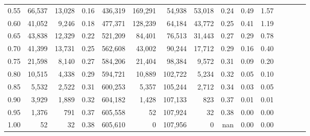 \begin{tabular}{rrrcrrrrrrrrrrr}
0.55 &  66,537 &  13,028 &                                       0.16 &  436,319 &  169,291 &   54,938 &   53,018 &  0.24 &  0.49 &                         1.57 \\
0.60 &  41,052 &   9,246 &                                       0.18 &  477,371 &  128,239 &   64,184 &   43,772 &  0.25 &  0.41 &                         1.19 \\
0.65 &  43,838 &  12,329 &                                       0.22 &  521,209 &   84,401 &   76,513 &   31,443 &  0.27 &  0.29 &                         0.78 \\
0.70 &  41,399 &  13,731 &                                       0.25 &  562,608 &   43,002 &   90,244 &   17,712 &  0.29 &  0.16 &                         0.40 \\
0.75 &  21,598 &   8,140 &                                       0.27 &  584,206 &   21,404 &   98,384 &    9,572 &  0.31 &  0.09 &                         0.20 \\
0.80 &  10,515 &   4,338 &                                       0.29 &  594,721 &   10,889 &  102,722 &    5,234 &  0.32 &  0.05 &                         0.10 \\
0.85 &   5,532 &   2,522 &                                       0.31 &  600,253 &    5,357 &  105,244 &    2,712 &  0.34 &  0.03 &                         0.05 \\
0.90 &   3,929 &   1,889 &                                       0.32 &  604,182 &    1,428 &  107,133 &      823 &  0.37 &  0.01 &                         0.01 \\
0.95 &   1,376 &     791 &                                       0.37 &  605,558 &       52 &  107,924 &       32 &  0.38 &  0.00 &                         0.00 \\
1.00 &      52 &      32 &                                       0.38 &  605,610 &        0 &  107,956 &        0 &   nan &  0.00 &                         0.00 \\
\bottomrule
\end{tabular}
